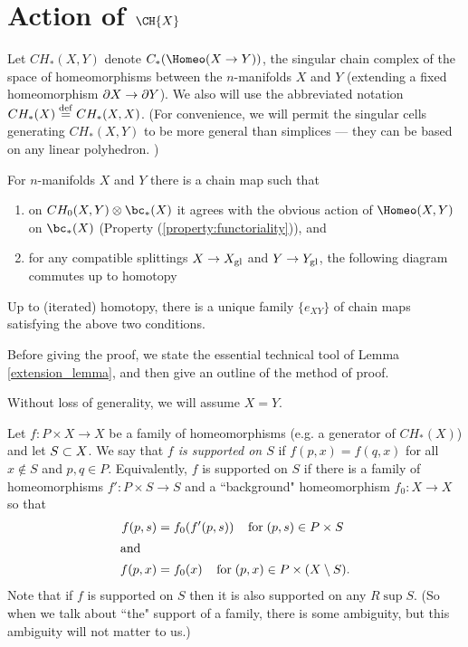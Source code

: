 
\section{Action of \texorpdfstring{$\CH{X}$}{$C_*(Homeo(M))$}}
\label{sec:evaluation}


Let $CH_*(X, Y)$ denote $C_*(\Homeo(X \to Y))$, the singular chain complex of
the space of homeomorphisms
between the $n$-manifolds $X$ and $Y$ (extending a fixed homeomorphism $\partial X \to \partial Y$).
We also will use the abbreviated notation $CH_*(X) \stackrel{\mathrm{def}}{=} CH_*(X, X)$.
(For convenience, we will permit the singular cells generating $CH_*(X, Y)$ to be more general
than simplices --- they can be based on any linear polyhedron.
)

\begin{prop}  \label{CHprop}
For $n$-manifolds $X$ and $Y$ there is a chain map
such that
\begin{enumerate}
\item on $CH_0(X, Y) \otimes \bc_*(X)$ it agrees with the obvious action of 
$\Homeo(X, Y)$ on $\bc_*(X)$ (Property (\ref{property:functoriality})), and
\item for any compatible splittings $X\to X_\mathrm{gl}$ and $Y\to Y_\mathrm{gl}$, 
the following diagram commutes up to homotopy
\end{enumerate}
Up to (iterated) homotopy, there is a unique family $\{e_{XY}\}$ of chain maps
satisfying the above two conditions.
\end{prop}

Before giving the proof, we state the essential technical tool of Lemma \ref{extension_lemma}, 
and then give an outline of the method of proof.

Without loss of generality, we will assume $X = Y$.

\medskip

Let $f: P \times X \to X$ be a family of homeomorphisms (e.g. a generator of $CH_*(X)$)
and let $S \subset X$.
We say that {\it $f$ is supported on $S$} if $f(p, x) = f(q, x)$ for all
$x \notin S$ and $p, q \in P$. Equivalently, $f$ is supported on $S$ if 
there is a family of homeomorphisms $f' : P \times S \to S$ and a ``background"
homeomorphism $f_0 : X \to X$ so that
\begin{align*}
	f(p,s) & = f_0(f'(p,s)) \;\;\;\; \mbox{for}\; (p, s) \in P\times S \\
\intertext{and}
	f(p,x) & = f_0(x) \;\;\;\; \mbox{for}\; (p, x) \in {P \times (X \setminus S)}.
\end{align*}
Note that if $f$ is supported on $S$ then it is also supported on any $R \sup S$.
(So when we talk about ``the" support of a family, there is some ambiguity,
but this ambiguity will not matter to us.)


